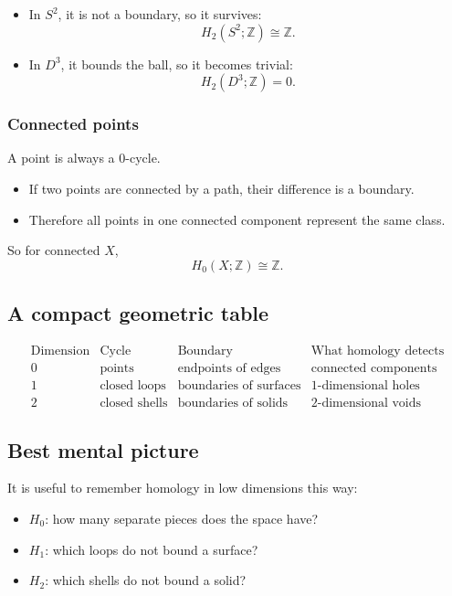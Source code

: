 \documentclass[12pt,a4paper]{article}
\newcommand{\Z}{\mathbb{Z}}
\theoremstyle{notespace}
\begin{document}
\begin{itemize}
	\item In \(S^2\), it is not a boundary, so it survives:
	\[
	H_2(S^2;\Z)\cong \Z.
	\]
	\item In \(D^3\), it bounds the ball, so it becomes trivial:
	\[
	H_2(D^3;\Z)=0.
	\]
\end{itemize}

\subsubsection*{Connected points}

A point is always a \(0\)-cycle.

\begin{itemize}
	\item If two points are connected by a path, their difference is a boundary.
	\item Therefore all points in one connected component represent the same class.
\end{itemize}

So for connected \(X\),
\[
H_0(X;\Z)\cong \Z.
\]

\subsection{A compact geometric table}

\[
\begin{array}{c|c|c|c}
	\text{Dimension} & \text{Cycle} & \text{Boundary} & \text{What homology detects} \\ \hline
	0 & \text{points} & \text{endpoints of edges} & \text{connected components} \\
	1 & \text{closed loops} & \text{boundaries of surfaces} & \text{\(1\)-dimensional holes} \\
	2 & \text{closed shells} & \text{boundaries of solids} & \text{\(2\)-dimensional voids}
\end{array}
\]

\subsection{Best mental picture}

It is useful to remember homology in low dimensions this way:

\begin{itemize}
	\item \(H_0\): how many separate pieces does the space have?
	\item \(H_1\): which loops do not bound a surface?
	\item \(H_2\): which shells do not bound a solid?
\end{itemize}
\end{document}
